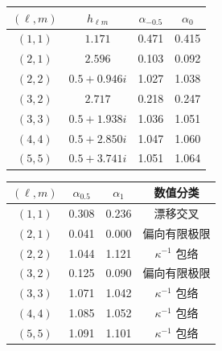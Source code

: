 \documentclass[UTF8,fontset=fandol,11pt,a4paper,oneside]{ctexart}
\numberwithin{equation}{section}
\begin{document}
\noindent\begin{minipage}{\linewidth}
\captionsetup{type=table}\caption{历史近极端三次阈值响应，待端点修正重算。}\label{audit:tab:near-extremal-threshold}
\centering\fontsize{10}{13.5}\selectfont
\setlength{\tabcolsep}{6pt}\renewcommand{\arraystretch}{1.2}
\par{}\par\smallskip
\begin{tabular}{cccc}\toprule
$(\ell,m)$ & $h_{\ell m}$ & $\alpha_{-0.5}$ & $\alpha_{0}$\\\midrule
$(1,1)$ & $1.171$ & 0.471 & 0.415\\
$(2,1)$ & $2.596$ & 0.103 & 0.092\\
$(2,2)$ & $0.5+0.946i$ & 1.027 & 1.038\\
$(3,2)$ & $2.717$ & 0.218 & 0.247\\
$(3,3)$ & $0.5+1.938i$ & 1.036 & 1.051\\
$(4,4)$ & $0.5+2.850i$ & 1.047 & 1.060\\
$(5,5)$ & $0.5+3.741i$ & 1.051 & 1.064\\
\bottomrule\end{tabular}
\par\medskip
\par{}\par\smallskip
\begin{tabular}{cccc}\toprule
$(\ell,m)$ & $\alpha_{0.5}$ & $\alpha_{1}$ & 数值分类\\\midrule
$(1,1)$ & 0.308 & 0.236 & 漂移交叉\\
$(2,1)$ & 0.041 & 0.000 & 偏向有限极限\\
$(2,2)$ & 1.044 & 1.121 & $\kappa^{-1}$ 包络\\
$(3,2)$ & 0.125 & 0.090 & 偏向有限极限\\
$(3,3)$ & 1.071 & 1.042 & $\kappa^{-1}$ 包络\\
$(4,4)$ & 1.085 & 1.052 & $\kappa^{-1}$ 包络\\
$(5,5)$ & 1.091 & 1.101 & $\kappa^{-1}$ 包络\\
\bottomrule\end{tabular}
\end{minipage}\par\addvspace{10pt}
\par\addvspace{14pt}
\end{document}
